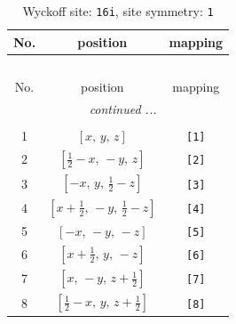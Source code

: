 \documentclass[fleqn,8pt]{jsarticle}
\begin{document}
\renewcommand{\arraystretch}{1.2}
\begin{longtable}{ccc}
\caption{Wyckoff site: {\tt 16i}, site symmetry: {\tt 1}}
 \\
 \hline \hline
No. & position & mapping \\ \hline \endfirsthead

\multicolumn{2}{l}{\tablename\ \thetable{}} \\
 \hline \hline
No. & position & mapping \\ \hline \endhead

 \hline \hline
\multicolumn{2}{r}{\footnotesize\it continued ...} \\ \endfoot

 \hline \hline
\multicolumn{2}{r}{} \\ \endlastfoot

1 & $\left[ x,\, y,\, z \right]$ & {\tt [1]} \\ \hline
2 & $\left[ \frac{1}{2} - x,\, - y,\, z \right]$ & {\tt [2]} \\ \hline
3 & $\left[ - x,\, y,\, \frac{1}{2} - z \right]$ & {\tt [3]} \\ \hline
4 & $\left[ x + \frac{1}{2},\, - y,\, \frac{1}{2} - z \right]$ & {\tt [4]} \\ \hline
5 & $\left[ - x,\, - y,\, - z \right]$ & {\tt [5]} \\ \hline
6 & $\left[ x + \frac{1}{2},\, y,\, - z \right]$ & {\tt [6]} \\ \hline
7 & $\left[ x,\, - y,\, z + \frac{1}{2} \right]$ & {\tt [7]} \\ \hline
8 & $\left[ \frac{1}{2} - x,\, y,\, z + \frac{1}{2} \right]$ & {\tt [8]} \\
\end{longtable}
\end{document}
